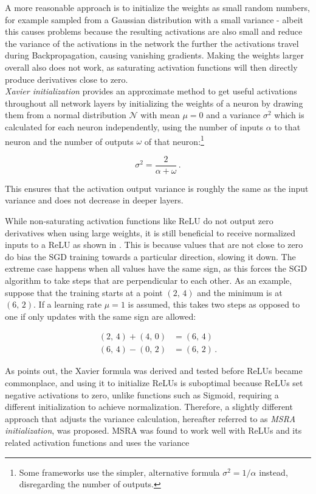 A more reasonable approach is to initialize the weights as small random numbers, for example sampled from a Gaussian distribution with a small variance - albeit this causes problems because the resulting activations are also small and reduce the variance of the activations in the network the further the activations travel during Backpropagation, causing vanishing gradients. Making the weights larger overall also does not work, as saturating activation functions will then directly produce derivatives close to zero. \cite{karpathy_lecture2}\\

\noindent \textit{Xavier initialization} \cite{glorot} provides an approximate method to get useful activations throughout all network layers by initializing the weights of a neuron by drawing them from a normal distribution $\mathcal{N}$ with mean $\mu = 0$ and a variance $\sigma^2$ which is calculated for each neuron independently, using the number of inputs $\alpha$ to that neuron and the number of outputs $\omega$ of that neuron:\footnote{Some frameworks use the simpler, alternative formula $\sigma^2 = 1/\alpha$ instead, disregarding the number of outputs.}

\[ \sigma^2 = \frac{2}{\alpha + \omega} \,. \]

\noindent This ensures that the activation output variance is roughly the same as the input variance and does not decrease in deeper layers.

\noindent While non-saturating activation functions like ReLU do not output zero derivatives when using large weights, it is still beneficial to receive normalized inputs to a ReLU as shown in \cite{lecun_norm}. This is because values that are not close to zero do bias the SGD training towards a particular direction, slowing it down. The extreme case happens when all values have the same sign, as this forces the SGD algorithm to take steps that are perpendicular to each other. As an example, suppose that the training starts at a point $(2,\, 4)$ and the minimum is at $(6,\, 2)$. If a learning rate $\mu = 1$ is assumed, this takes two steps as opposed to one if only updates with the same sign are allowed:

\begin {align}
	(2,\, 4) + (4,\, 0) &= (6,\, 4)\\
	(6,\, 4) - (0,\, 2) &= (6,\, 2) \,.
\end {align}

\noindent As \cite{rectifiers} points out, the Xavier formula was derived and tested before ReLUs became commonplace, and using it to initialize ReLUs is suboptimal because ReLUs set negative activations to zero, unlike functions such as Sigmoid, requiring a different initialization to achieve normalization. Therefore, a slightly different approach that adjusts the variance calculation, hereafter referred to as \textit{MSRA initialization}, was proposed. MSRA was found to work well with ReLUs and its related activation functions and uses the variance

